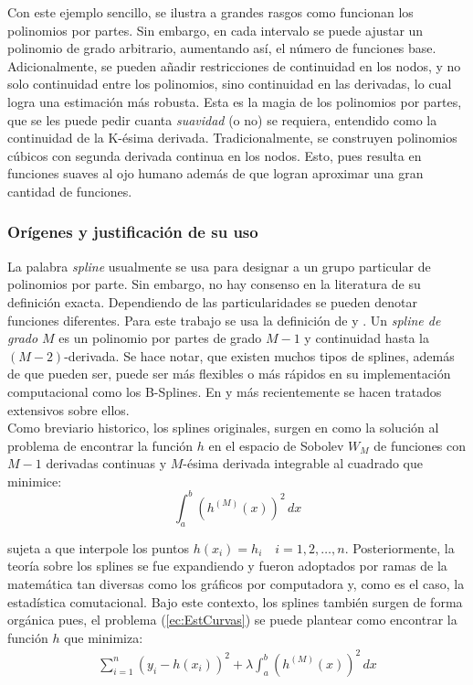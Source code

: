 \documentclass[../Main/Main.tex]{subfiles}
\begin{document}
Con este ejemplo sencillo, se ilustra a grandes rasgos como funcionan los polinomios por partes. Sin embargo, en cada intervalo se puede ajustar un polinomio de grado arbitrario, aumentando así, el número de funciones base. Adicionalmente, se pueden añadir restricciones de continuidad en los nodos, y no solo continuidad entre los polinomios, sino continuidad en las derivadas, lo cual logra una estimación más robusta. Esta es la magia de los polinomios por partes, que se les puede pedir cuanta \textit{suavidad} (o no) se requiera, entendido como la continuidad de la K-ésima derivada. Tradicionalmente, se construyen polinomios cúbicos con segunda derivada continua en los nodos. Esto, pues resulta en funciones suaves al ojo humano además de que logran aproximar una gran cantidad de funciones.

\subsubsection{Orígenes y justificación de su uso}
La palabra \textit{spline} usualmente se usa para designar a un grupo particular de polinomios por parte. Sin embargo, no hay consenso en la literatura de su definición exacta. Dependiendo de las particularidades se pueden denotar funciones diferentes. Para este trabajo se usa la definición de \autocite{wasserman2007all} y \autocite{hastie2008elements}.  Un \textit{spline de grado $M$} es un polinomio por partes de grado $M-1$ y continuidad hasta la $(M-2)$-derivada. Se hace notar, que existen muchos tipos de splines, además de que pueden ser, puede ser más flexibles o más rápidos en su implementación computacional como los B-Splines. En \autocite{deboor1978splines} y más recientemente \autocite{wahba1990splines} se hacen tratados extensivos sobre ellos.\\

Como breviario historico, los splines originales, surgen en \autocite{schoenberg1964spline} como la solución al problema de encontrar la función $h$ en el espacio de Sobolev $W_{M}$ de funciones con $M-1$ derivadas continuas y $M$-ésima derivada integrable al cuadrado que minimice:
$$\int_a^b(h^{(M)}(x))^2\,dx$$ 

sujeta a que interpole los puntos $h(x_i) = h_i \quad i = 1,2,\ldots,n$. Posteriormente, la teoría sobre los splines se fue expandiendo y fueron adoptados por ramas de la matemática tan diversas como los gráficos por computadora y, como es el caso, la estadística comutacional. Bajo este contexto, los splines también surgen de forma orgánica pues, el problema (\ref{ec:EstCurvas}) se puede plantear como encontrar la función $h$ que minimiza:
\begin{align}
	\sum_{i=1}^n(y_i - h(x_i))^2 + \lambda\int_a^b (h^{(M)}(x))^2 \, dx \label{ec:SplinesConRegularizacion}
\end{align}
\end{document}

